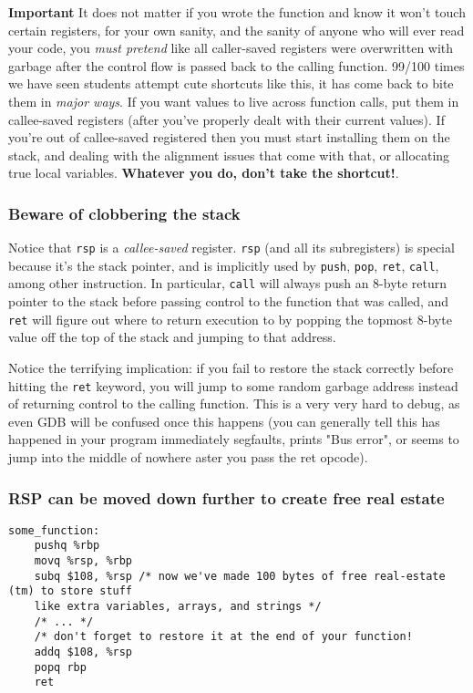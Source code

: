 \documentclass[11pt]{article}
\begin{document}
\textbf{Important} It does not matter if you wrote the function and know it won't touch
certain registers, for your own sanity, and the sanity of anyone who will ever read your
code, you \emph{must pretend} like all caller-saved registers were overwritten with
garbage after the control flow is passed back to the calling function. 99/100 times we
have seen students attempt cute shortcuts like this, it has come back to bite them in
\emph{major ways}. If you want values to live across function calls, put them in
callee-saved registers (after you've properly dealt with their current values). If you're
out of callee-saved registered then you must start installing them on the stack, and
dealing with the alignment issues that come with that, or allocating true local variables.
\textbf{Whatever you do, don't take the shortcut!}.

\subsubsection{Beware of clobbering the stack}

Notice that \texttt{rsp} is a \emph{callee-saved} register. \texttt{rsp} (and all its
subregisters) is special because it's the stack pointer, and is implicitly used by
\texttt{push}, \texttt{pop}, \texttt{ret}, \texttt{call}, among other instruction. In
particular, \texttt{call} will always push an 8-byte return pointer to the stack before
passing control to the function that was called, and \texttt{ret} will figure out where to
return execution to by popping the topmost 8-byte value off the top of the stack and
jumping to that address.

Notice the terrifying implication: if you fail to restore the stack correctly before
hitting the \texttt{ret} keyword, you will jump to some random garbage address instead of
returning control to the calling function. This is a very very hard to debug, as even GDB
will be confused once this happens (you can generally tell this has happened in your
program immediately segfaults, prints "Bus error", or seems to jump into the middle of
nowhere aster you pass the ret opcode).

\subsubsection{RSP can be moved down further to create free real estate}

\begin{lstlisting}
some_function:
    pushq %rbp
    movq %rsp, %rbp
    subq $108, %rsp /* now we've made 100 bytes of free real-estate (tm) to store stuff
    like extra variables, arrays, and strings */
    /* ... */
    /* don't forget to restore it at the end of your function!
    addq $108, %rsp
    popq rbp
    ret
\end{lstlisting}
\end{document}
